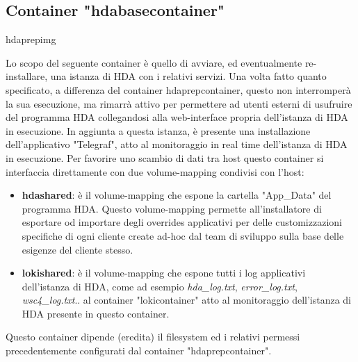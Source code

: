 \subsection{Container "hdabasecontainer"}

\begin{namespacedesc}
	 {hdaprepimg}
	 {Lo scopo del seguente container è quello di avviare, ed eventualmente re-installare, una istanza di HDA con i relativi servizi. Una volta fatto quanto specificato, a differenza del container hdaprepcontainer, questo non interromperà la sua esecuzione, ma rimarrà attivo per permettere ad utenti esterni di usufruire del programma HDA collegandosi alla web-interface propria dell'istanza di HDA in esecuzione. In aggiunta a questa istanza, è presente una installazione dell'applicativo "Telegraf", atto al monitoraggio in real time dell'istanza di HDA in esecuzione. 
Per favorire uno scambio di dati tra host questo container si interfaccia direttamente con due volume-mapping condivisi con l'host:
\begin{itemize}
	\item \textbf{hdashared}: è il volume-mapping che espone la cartella "App\_Data" del programma HDA. Questo volume-mapping permette all'installatore di esportare od importare degli overrides applicativi per delle customizzazioni specifiche di ogni cliente create ad-hoc dal team di sviluppo sulla base delle esigenze del cliente stesso.
	\item \textbf{lokishared}: è il volume-mapping che espone tutti i log applicativi dell'istanza di HDA, come ad esempio \textit{hda\_log.txt}, \textit{error\_log.txt}, \textit{wsc4\_log.txt}.. al container "lokicontainer" atto al monitoraggio dell'istanza di HDA presente in questo container.
\end{itemize}
Questo container dipende (eredita) il filesystem  ed i relativi permessi precedentemente configurati dal container "hdaprepcontainer".}
\end{namespacedesc}


